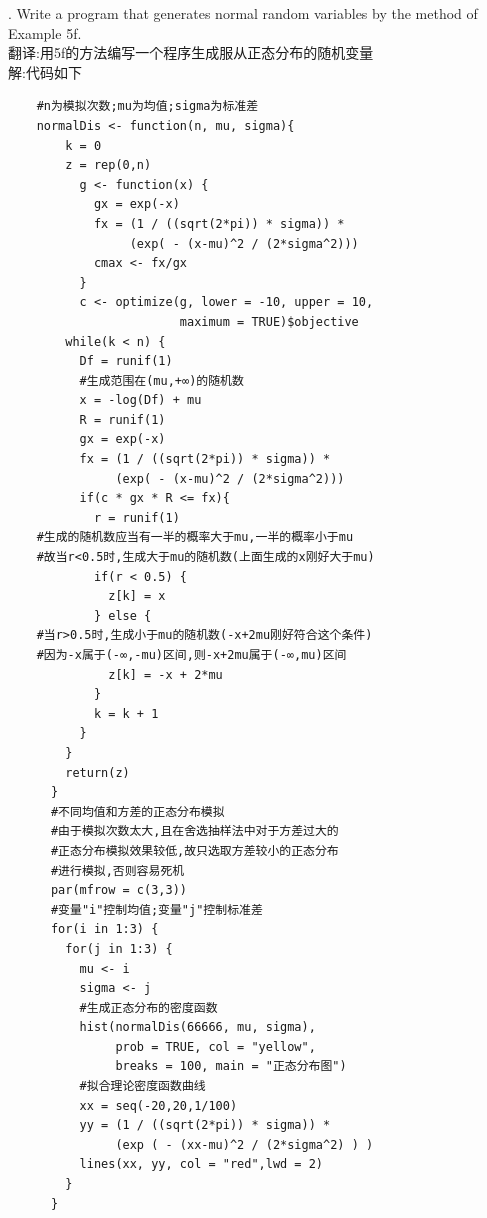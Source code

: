 \documentclass{book}
\begin{document}
. Write a program that generates normal random variables by the method of Example 5f. \\
翻译:用5f的方法编写一个程序生成服从正态分布的随机变量 \\
解:代码如下
\lstset{language = R}
\begin{lstlisting}
    #n为模拟次数;mu为均值;sigma为标准差
    normalDis <- function(n, mu, sigma){
        k = 0
        z = rep(0,n)
          g <- function(x) {
            gx = exp(-x)
            fx = (1 / ((sqrt(2*pi)) * sigma)) *
                 (exp( - (x-mu)^2 / (2*sigma^2)))
            cmax <- fx/gx
          }
          c <- optimize(g, lower = -10, upper = 10,
                        maximum = TRUE)$objective
        while(k < n) {
          Df = runif(1)
          #生成范围在(mu,+∞)的随机数
          x = -log(Df) + mu  
          R = runif(1)
          gx = exp(-x)
          fx = (1 / ((sqrt(2*pi)) * sigma)) *
               (exp( - (x-mu)^2 / (2*sigma^2)))
          if(c * gx * R <= fx){
            r = runif(1)
    #生成的随机数应当有一半的概率大于mu,一半的概率小于mu
    #故当r<0.5时,生成大于mu的随机数(上面生成的x刚好大于mu)
            if(r < 0.5) {  
              z[k] = x
            } else {
    #当r>0.5时,生成小于mu的随机数(-x+2mu刚好符合这个条件)
    #因为-x属于(-∞,-mu)区间,则-x+2mu属于(-∞,mu)区间
              z[k] = -x + 2*mu
            }
            k = k + 1
          }
        }
        return(z) 
      }
      #不同均值和方差的正态分布模拟
      #由于模拟次数太大,且在舍选抽样法中对于方差过大的
      #正态分布模拟效果较低,故只选取方差较小的正态分布
      #进行模拟,否则容易死机
      par(mfrow = c(3,3))
      #变量"i"控制均值;变量"j"控制标准差
      for(i in 1:3) {
        for(j in 1:3) {
          mu <- i
          sigma <- j
          #生成正态分布的密度函数
          hist(normalDis(66666, mu, sigma), 
               prob = TRUE, col = "yellow", 
               breaks = 100, main = "正态分布图")
          #拟合理论密度函数曲线
          xx = seq(-20,20,1/100) 
          yy = (1 / ((sqrt(2*pi)) * sigma)) *
               (exp ( - (xx-mu)^2 / (2*sigma^2) ) )
          lines(xx, yy, col = "red",lwd = 2)
        }
      }
\end{lstlisting}
\end{document}
